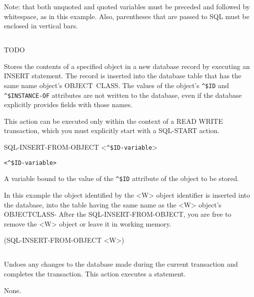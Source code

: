 {{Note: that both unquoted and quoted variables must be
preceded and followed by whitespace, as in this example.
Also, parentheses that are passed to SQL must be enclosed in
vertical bars.

\subsection{}
TODO

Stores the contents of a specified object in a new database
record by executing an INSERT statement. The record is
inserted into the database table that has the same name
object's OBJECT~CLASS. The values of the object's \verb|^$ID| and
\verb|^$INSTANCE-OF| attributes are not written to the database,
even if the database explicitly provides fields with those
names.

This action can be executed only within the context of a READ
WRITE transaction, which you must explicitly start with a
SQL-START action.



\Format

SQL-INSERT-FROM-OBJECT <\verb|^$ID-variable|>

\Argument

\verb|<^$ID-variable>|

A variable bound to the value of the \verb|^$ID| attribute of the
object to be stored.



\Example

In this example the object identified by the <W> object
identifier is inserted into the database, into the table
having the same name as the <W> object's OBJECTCLASS- After
the SQL-INSERT-FROM-OBJECT, you are free to remove the <W>
object or leave it in working memory.



(SQL-INSERT-FROM-OBJECT <W>)

\subsection{}

Undoes any changes to the database made during the current transaction
and completes the transaction. This action executes a 
statement.

\Format


\Arguments

None.

}}
